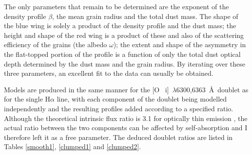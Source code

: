 The only parameters that  remain to be determined are the exponent of 
the density profile $\beta$, the mean grain radius and the total dust 
mass.  The shape of the blue wing is solely a product of the density 
profile and the dust mass; the height and shape of the red wing is a 
product of these and also of the scattering efficiency of the grains (the 
albedo $\omega$); the extent and shape of the asymmetry in the flat-topped 
portion of the profile is a function of only the total dust optical depth 
determined by the dust mass and the grain radius.  By iterating over these 
three parameters, an excellent fit to the data can usually be 
obtained.

Models are produced in the same manner for the [O~{\sc 
i}]~$\lambda$6300,6363~\AA\ doublet as for the single H$\alpha$ line, with 
each component of the doublet being modelled independently and the 
resulting profiles added according to a specified ratio.  Although the 
theoretical intrinsic flux ratio is 3.1 for optically thin emission \citep{Storey2000}, the 
actual ratio between the two components can be affected by self-absorption 
\citep{Li1992} and I therefore left it as a free parameter.  The deduced 
doublet ratios are listed in Tables \ref{smooth1}, \ref{clumped1} and 
\ref{clumped2}.


